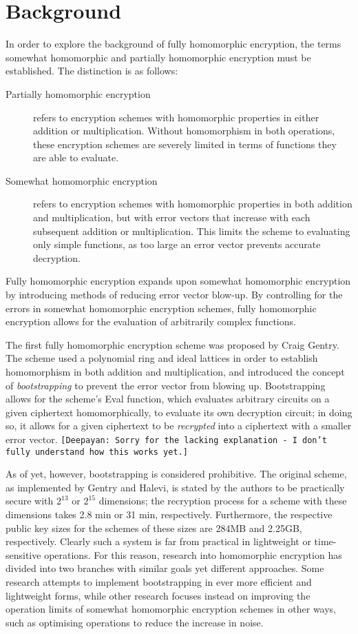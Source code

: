 \documentclass[dvips,12pt]{article}
\begin{document}
\section{Background}

In order to explore the background of fully homomorphic encryption, the terms 
somewhat homomorphic and partially homomorphic encryption must be established.
The distinction is as follows:
\begin{description}
\item[Partially homomorphic encryption] refers to encryption schemes with homomorphic
properties in either addition or multiplication. Without homomorphism in both operations,
these encryption schemes are severely limited in terms of functions they are able to evaluate.
\item[Somewhat homomorphic encryption] refers to encryption schemes with homomorphic
properties in both addition and multiplication, but with error vectors that increase with each
subsequent addition or multiplication. This limits the scheme to evaluating only simple functions,
as too large an error vector prevents accurate decryption.
\end{description}
\par Fully homomorphic encryption expands upon somewhat homomorphic encryption by introducing
methods of reducing error vector blow-up. By controlling for the errors in somewhat homomorphic
encryption schemes, fully homomorphic encryption allows for the evaluation of arbitrarily complex
functions. 

\par The first fully homomorphic encryption scheme was proposed by Craig Gentry.\cite{Gentry09} 
The scheme used a polynomial ring and ideal lattices in order to establish homomorphism in both
addition and multiplication, and introduced the concept of \emph{bootstrapping} to prevent the
error vector from blowing up. Bootstrapping allows for the scheme's Eval function, which evaluates
arbitrary circuits on a given ciphertext homomorphically, to evaluate its own decryption circuit; in doing so,
it allows for a given ciphertext to be \emph{recrypted} into a ciphertext with a smaller error vector. \texttt{[Deepayan:
Sorry for the lacking explanation - I don't fully understand how this works yet.]}
\par As of yet, however, bootstrapping is considered prohibitive. The original scheme, as implemented
by Gentry and Halevi, is stated by the authors to be practically secure with $2^{13}$ or $2^{15}$ dimensions;
the recryption process for a scheme with these dimensions takes 2.8 min or 31 min, respectively. Furthermore, 
the respective public key sizes for the schemes of these sizes are 284MB and 2.25GB, respectively.\cite{gentryimp}
Clearly such a system is far from practical in lightweight or time-sensitive operations. For this reason, research into homomorphic
encryption has divided into two branches with similar goals yet different approaches. Some research attempts to implement
bootstrapping in ever more efficient and lightweight forms, while other research focuses instead on improving the
operation limits of somewhat homomorphic encryption schemes in other ways, such as optimising operations to reduce the increase in noise.
\end{document}
